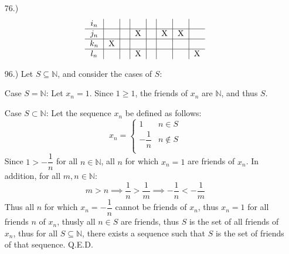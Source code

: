 \documentclass[12pt]{article}
\begin{document}
\begin{itemize}
    \item [76.)]
    \[
    \begin{tabular}{c|c|c|c|c|c|c|c}
        $i_n$ & & & & & & & \\
        \hline
        $j_n$ & & & X & & X & X \\
        \hline
        $k_n$ & X & & & & & & \\
        \hline
        $l_n$ & & & X & & & & X \\
    \end{tabular}
    \]










    \item [96.)] Let $S\subseteq\mathbb{N}$, and consider the cases of $S$:

    Case $S=\mathbb N$: Let $x_n=1$. Since $1\geq 1$, the friends of $x_n$ are $\mathbb{N}$, and thus $S$.

    Case $S\subset\mathbb{N}$: Let the sequence $x_n$ be defined as follows:
    \[x_n=\begin{cases}
        1 & n\in S \\
        -\dfrac{1}{n} & n\notin S \\
    \end{cases}\]
    Since $1>-\dfrac{1}{n}$ for all $n\in\mathbb{N}$, all $n$ for which $x_n=1$ are friends of $x_n$. In addition, for all $m,n\in\mathbb{N}$:
    \[m>n\implies\dfrac{1}{n}>\dfrac{1}{m}\implies-\dfrac{1}{n}<-\frac{1}{m}\]
    Thus all $n$ for which $x_n=-\dfrac{1}{n}$ cannot be friends of $x_n$, thus $x_n=1$ for all friends $n$ of $x_n$, thusly all $n\in S$ are friends, thus $S$ is the set of all friends of $x_n$, thus for all $S\subseteq\mathbb{N}$, there exists a sequence such that $S$ is the set of friends of that sequence. Q.E.D.


\end{itemize}
\end{document}
